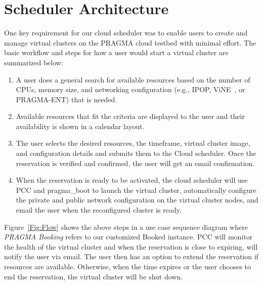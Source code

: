 \documentclass[times]{cpeauth}
\begin{document}
\section{Scheduler Architecture}
\label{Sec:Arch}

One key requirement for our cloud scheduler was to enable users to create and manage virtual clusters on the PRAGMA cloud testbed with minimal effort. 
The basic workflow and steps for how a user would start a virtual cluster are summarized below:

\begin{enumerate}
\item A user does a general search for available resources based on the number of CPUs, memory size, and networking configuration (e.g., IPOP, ViNE~\cite{vine}, or PRAGMA-ENT) that is needed.  
\item Available resources that fit the criteria are displayed to the user and their availability is shown in a calendar layout.  
\item The user selects the desired resources, the timeframe, virtual cluster image, and configuration details and submits them to the Cloud scheduler.  Once the reservation is verified and confirmed, the user will get an email confirmation.  
\item When the reservation is ready to be activated, the cloud scheduler will use PCC and pragma\_boot to launch the virtual cluster, automatically configure the private and public network configuration on the virtual cluster nodes, and email the user when the reconfigured cluster is ready.   
\end{enumerate}

Figure~\ref{Fig:Flow} shows the above steps in a use case sequence diagram where \textit{PRAGMA Booking} refers to our customized Booked instance.  PCC will monitor the health of the virtual cluster and when the reservation is close to expiring, will notify the user via email. The user then has an option to extend the reservation if resources are available.  Otherwise, when the time expires or the user chooses to end the reservation, the virtual cluster will be shut down.
\end{document}
